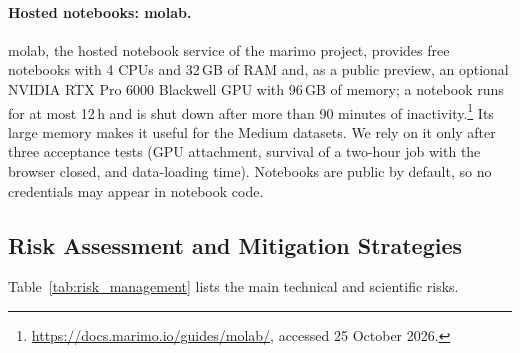 \documentclass[11pt,a4paper]{article}
\begin{document}
\paragraph{Hosted notebooks: molab.} molab, the hosted notebook service of the marimo project, provides free notebooks with 4 CPUs and 32\,GB of RAM and, as a public preview, an optional NVIDIA RTX Pro 6000 Blackwell GPU with 96\,GB of memory; a notebook runs for at most 12\,h and is shut down after more than 90 minutes of inactivity.\footnote{\url{https://docs.marimo.io/guides/molab/}, accessed 25 October 2026.} Its large memory makes it useful for the Medium datasets. We rely on it only after three acceptance tests (GPU attachment, survival of a two-hour job with the browser closed, and data-loading time). Notebooks are public by default, so no credentials may appear in notebook code.

\subsection{Risk Assessment and Mitigation Strategies}
Table~\ref{tab:risk_management} lists the main technical and scientific risks.
\end{document}
